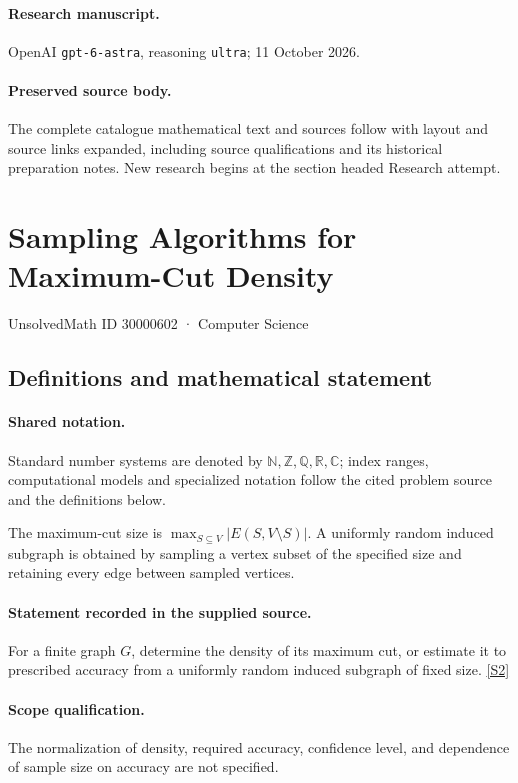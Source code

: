 \documentclass[11pt]{article}
\begin{document}
\paragraph{Research manuscript.} OpenAI \texttt{gpt-6-astra}, reasoning \texttt{ultra}; 11 October 2026.
\paragraph{Preserved source body.} The complete catalogue mathematical text and sources follow with layout and source links expanded, including source qualifications and its historical preparation notes. New research begins at the section headed Research attempt.

\section{Sampling Algorithms for Maximum-Cut Density}\label{30000602}
{\small UnsolvedMath ID 30000602 · Computer Science}
\subsection{Definitions and mathematical statement}

\paragraph{Shared notation.}Standard number systems are denoted by $\mathbb N,\mathbb Z,\mathbb Q,\mathbb R,\mathbb C$; index ranges, computational models and specialized notation follow the cited problem source and the definitions below.


The maximum-cut size is $\max_{S\subseteq V}|E(S,V\setminus S)|$. A uniformly random induced subgraph is obtained by sampling a vertex subset of the specified size and retaining every edge between sampled vertices.
\paragraph{Statement recorded in the supplied source.}
For a finite graph $G$, determine the density of its maximum cut, or estimate it to prescribed accuracy from a uniformly random induced subgraph of fixed size. \href{https://doi.org/10.4171/owr/2006/48}{[S2]}
\paragraph{Scope qualification.}
The normalization of density, required accuracy, confidence level, and dependence of sample size on accuracy are not specified.
\end{document}
